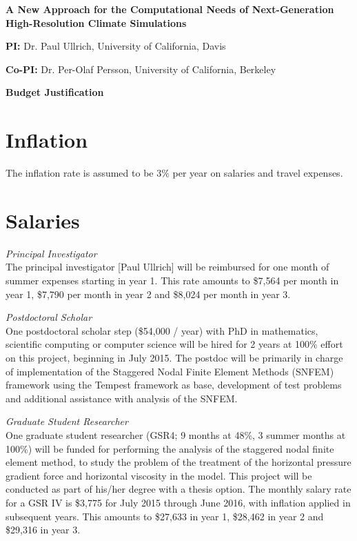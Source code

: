 \documentclass[11pt]{article}
\begin{document}
{\large \textbf{A New Approach for the Computational Needs of Next-Generation High-Resolution Climate Simulations}}

\textbf{PI:} Dr. Paul Ullrich, University of California, Davis

\textbf{Co-PI:} Dr. Per-Olaf Persson, University of California, Berkeley

\vspace{0.3cm}

{\Large \textbf{Budget Justification}}

\section{Inflation}
\vspace{-0.3cm}

The inflation rate is assumed to be 3\% per year on salaries and travel expenses.

\section{Salaries}
\vspace{-0.3cm}

\textit{Principal Investigator} \\
The principal investigator [Paul Ullrich] will be reimbursed for one month of summer expenses starting in year 1.  This rate amounts to \$7,564 per month in year 1, \$7,790 per month in year 2 and \$8,024 per month in year 3.

\textit{Postdoctoral Scholar} \\
One postdoctoral scholar step (\$54,000 / year) with PhD in mathematics, scientific computing or computer science will be hired for 2 years at 100\% effort on this project, beginning in July 2015.  The postdoc will be primarily in charge of implementation of the Staggered Nodal Finite Element Methods (SNFEM) framework using the Tempest framework as base, development of test problems and additional assistance with analysis of the SNFEM.

\textit{Graduate Student Researcher} \\
One graduate student researcher (GSR4; 9 months at 48\%, 3 summer months at 100\%) will be funded for performing the analysis of the staggered nodal finite element method, to study the problem of the treatment of the horizontal pressure gradient force and horizontal viscosity in the model.  This project will be conducted as part of his/her degree with a thesis option.  The monthly salary rate for a GSR IV is \$3,775 for July 2015 through June 2016, with inflation applied in subsequent years.  This amounts to \$27,633 in year 1, \$28,462 in year 2 and \$29,316 in year 3.
\end{document}

